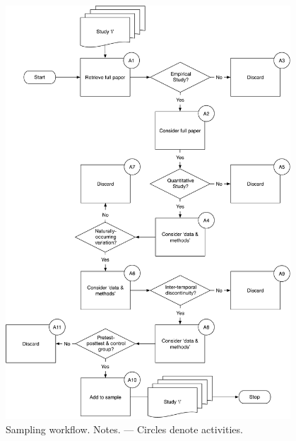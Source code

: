 \begin{figure}
	\begin{small}
		\begin{center}
			\includegraphics[width=0.95\textwidth]{exhibits/sampling_workflow.pdf}
		\end{center}
		\caption{Sampling workflow. Notes. --- Circles denote activities.}
		\label{fig:sampling_workflow}
	\end{small}
\end{figure}

